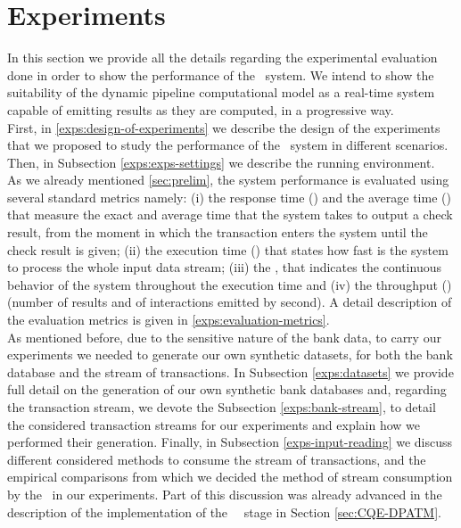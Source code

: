 \newpage
\section{Experiments}\label{sec:experiments}

In this section we provide all the details regarding the experimental evaluation done in order to show the performance of the \DPATM\ system. 
We intend to show the suitability of the dynamic pipeline computational model as a real-time system capable of emitting results as they are computed, in a progressive way.\\

First, in \ref{exps:design-of-experiments} we describe the design of the experiments 
that we proposed to study the performance of the \DPATM\ system in different scenarios. 
Then, in Subsection \ref{exps:exps-settings} we describe the running environment.\\

As we already mentioned \ref{sec:prelim}, the system performance is evaluated using several standard metrics namely: 
(i) the response time (\RT) and the average time (\MRT) that measure the exact and average time that the system takes to output a check result, 
from the moment in which the transaction enters the system until the check result is given; 
(ii) the execution time (\ET) that states how fast is the system to process the whole input data stream; 
(iii) the \dieft, that indicates the continuous behavior of the system throughout the execution time and (iv) the throughput (\T) 
(number of results and of interactions emitted by second). 
A detail description of the evaluation metrics is given in \ref{exps:evaluation-metrics}.\\

As mentioned before, due to the sensitive nature of the bank data, to carry our experiments we needed to generate our own synthetic datasets, 
for both the bank database and the stream of transactions. 
In Subsection \ref{exps:datasets} we provide full detail on the generation of our own synthetic bank databases and, 
regarding the transaction stream, we devote the Subsection \ref{exps:bank-stream}, to detail the considered transaction 
streams for our experiments and explain how we performed their generation. 
Finally, in Subsection \ref{exps-input-reading} we discuss different considered methods to consume the stream of transactions, 
and the empirical comparisons from which we decided the method of stream consumption by the \DPATM\ in our experiments. 
Part of this discussion was already advanced in the description of the implementation of the \source\ \Sr\ stage in Section \ref{sec:CQE-DPATM}.\\

